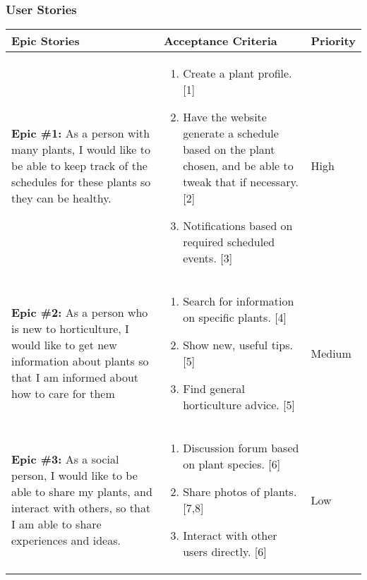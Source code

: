 \documentclass[portfolio.tex.tex]{subfiles}
\begin{document}
				\subsubsection{User Stories}
					\vspace{1cm}
					\begin{tabular}{p{6cm}|p{6cm}|p{4cm}}
						\large\textbf{Epic Stories} & \large \textbf{Acceptance Criteria \newline [Referenced User Story]} &\large \textbf{ Priority} \\
						\hline

						\textbf{Epic \#1:} As a person with many plants, I would like to be able to keep track of the schedules for these plants so they can be healthy.  &
						\vspace{-0.8cm}
						\begin{enumerate}
							\item  Create a plant profile. [1]
							\item 	Have the website generate a schedule based on the plant chosen, and be able to tweak that if necessary. [2]
							\item 	Notifications based on required scheduled events. [3]
						\end{enumerate}&

						\vspace{-1cm}\color{red}High\\

						\textbf{Epic \#2:} As a person who is new to horticulture, I would like to get new information about plants so that I am informed about how to care for them  &
						\vspace{-0.8cm}
						\begin{enumerate}
							\item   Search for information on specific plants. [4]
							\item 	Show new, useful tips. [5]
							\item 	Find general horticulture advice. [5]
						\end{enumerate}&

						\vspace{-1cm}\color{orange}Medium\\

						\textbf{Epic \#3:} As a social person, I would like to be able to share my plants, and interact with others, so that I am able to share experiences and ideas.  &
						\vspace{-0.8cm}
						\begin{enumerate}
							\item  	Discussion forum based on plant species. [6]
							\item 	Share photos of plants. [7,8]
							\item 	Interact with other users directly. [6]
						\end{enumerate}&

						\vspace{-1cm}\color{blue}Low\\

					\end{tabular}
\end{document}
